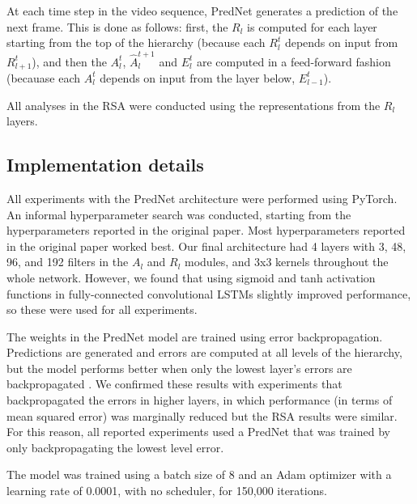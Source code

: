 \documentclass[12pt,twoside]{article}
\newif\myifpdf
\begin{document}
At each time step in the video sequence, PredNet generates a prediction of the next frame. This is done as follows: first, the $R_l$ is computed for each layer starting from the top of the hierarchy (because each $R_l^t$ depends on input from $R_{l+1}^t$), and then the $A_l^t$, $\hat{A}_l^{t+1}$ and $E_l^t$ are computed in a feed-forward fashion (becauase each $A_l^t$ depends on input from the layer below, $E_{l-1}^t$). 

All analyses in the RSA were conducted using the representations from the $R_l$ layers. 

\subsection{Implementation details}

All experiments with the PredNet architecture were performed using PyTorch. An informal hyperparameter search was conducted, starting from the hyperparameters reported in the original paper. Most hyperparameters reported in the original paper worked best. Our final architecture had 4 layers with 3, 48, 96, and 192 filters in the $A_l$ and $R_l$ modules, and 3x3 kernels throughout the whole network. However, we found that using sigmoid and tanh activation functions in fully-connected convolutional LSTMs slightly improved performance, so these were used for all experiments.

The weights in the PredNet model are trained using error backpropagation. Predictions are generated and errors are computed at all levels of the hierarchy, but the model performs better when only the lowest layer's errors are backpropagated \cite{LotterKreimanCox16}. We confirmed these results with experiments that backpropagated the errors in higher layers, in which performance (in terms of mean squared error) was marginally reduced but the RSA results were similar. For this reason, all reported experiments used a PredNet that was trained by only backpropagating the lowest level error.

The model was trained using a batch size of 8 and an Adam optimizer with a learning rate of 0.0001, with no scheduler, for 150,000 iterations.



\end{document}
